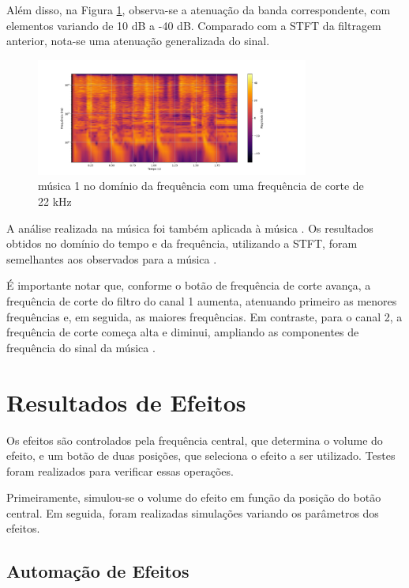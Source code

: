 Além disso, na Figura \ref{fig31}, observa-se a atenuação da banda correspondente, com elementos variando de 10 dB a -40 dB. Comparado com a STFT da filtragem anterior, nota-se uma atenuação generalizada do sinal.

\begin{figure}[h]
    \centering
    \includegraphics[width=0.8\textwidth]{figuras/fig31.png}
    \caption{música 1 no domínio da frequência com uma frequência de corte de 22 kHz}
    \label{fig31}
\end{figure}

A análise realizada na música \cite{track01} foi também aplicada à música \cite{track02}. Os resultados obtidos no domínio do tempo e da frequência, utilizando a STFT, foram semelhantes aos observados para a música \cite{track01}.

É importante notar que, conforme o botão de frequência de corte avança, a frequência de corte do filtro do canal 1 aumenta, atenuando primeiro as menores frequências e, em seguida, as maiores frequências. Em contraste, para o canal 2, a frequência de corte começa alta e diminui, ampliando as componentes de frequência do sinal da música \cite{track02}.

\section{Resultados de Efeitos}

Os efeitos são controlados pela frequência central, que determina o volume do efeito, e um botão de duas posições, que seleciona o efeito a ser utilizado. Testes foram realizados para verificar essas operações.

Primeiramente, simulou-se o volume do efeito em função da posição do botão central. Em seguida, foram realizadas simulações variando os parâmetros dos efeitos.

\subsection{Automação de Efeitos}

